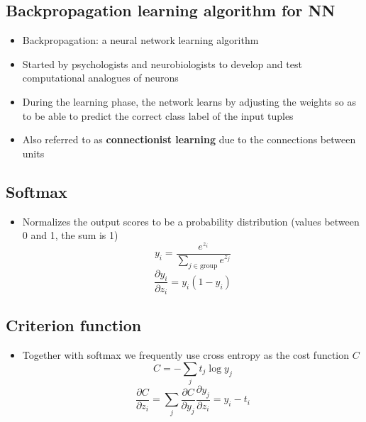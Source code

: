 \documentclass{article}
\begin{document}
    \subsection{Backpropagation learning algorithm for NN}
    \begin{itemize}
        \item Backpropagation: a neural network learning algorithm
        \item Started by psychologists and neurobiologists to develop and test computational analogues of neurons
        \item During the learning phase, the network learns by adjusting the weights so as to be able to predict the correct class label of the input tuples
        \item Also referred to as \textbf{connectionist learning} due to the connections between units
    \end{itemize}
    
    \subsection{Softmax}
    \begin{itemize}
        \item Normalizes the output scores to be a probability distribution (values between 0 and 1, the sum is 1)
        \[ y_i = \frac{e^{z_i}}{\sum_{j \in \text{group}} e^{z_j}} \]
        \[ \frac{\partial y_i}{\partial z_i} = y_i (1 - y_i) \]
    \end{itemize}

    \subsection{Criterion function}
    \begin{itemize}
        \item Together with softmax we frequently use cross entropy as the cost function $C$
        \[ C = - \sum_j t_j \log y_j \]
        \[ \frac{\partial C}{\partial z_i} = \sum_j \frac{\partial C}{\partial y_j} \frac{\partial y_j}{\partial z_i} = y_i - t_i \]
    \end{itemize}
\end{document}
